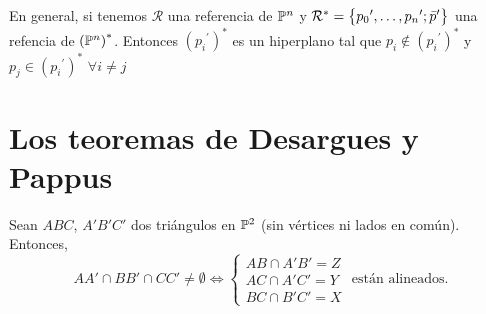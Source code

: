 \begin{obs}
En general, si tenemos $\mathcal{R}$ una referencia de $\mathbb{P}^n$ y
$\mathcal{R}^* = \left\{{p_0}^\prime,\dots,{p_n}^\prime; \bar{p}^\prime\right\}$
una refencia de $\left( \mathbb{P}^n \right)^*$. Entonces $\left( {p_i}^\prime \right)^*$
es un hiperplano tal que $p_i \notin \left( {p_i}^\prime \right)^*$ y
$p_j \in \left( {p_i}^\prime \right)^*$ $\forall i \neq j$
\end{obs}


\section{Los teoremas de Desargues y Pappus}

\begin{teo}[de Desargues]

Sean $ABC$, $A'B'C'$ dos triángulos en $\mathbb{P}^2$ (sin vértices ni lados en común). Entonces,
\[
AA' \cap BB' \cap CC' \neq \emptyset \iff
\begin{cases}
AB \cap A'B' = Z \\
AC \cap A'C' = Y \\
BC \cap B'C' = X
\end{cases}
\text{ están alineados.}
\]


\end{teo}
